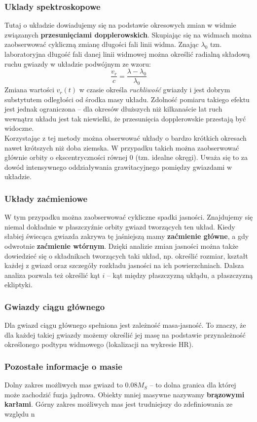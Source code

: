\documentclass[../index.tex]{subfiles}
\begin{document}
            \subsubsection{Uklady spektroskopowe}
                Tutaj o układzie dowiadujemy się na podstawie okresowych zmian w widmie związanych \textbf{przesunięciami dopplerowskich}. Skupiając się na widmach można zaobserwować cykliczną zmianę długości fali linii widma. Znając \(\lambda_0\) tzn. laboratoryjna długość fali danej linii widmowej można określić radialną składową ruchu gwiazdy w układzie podwójnym ze wzoru:
                \begin{equation}
                    \frac{v_r}{c}  = \frac{\lambda -\lambda_0}{\lambda_0} 
                \end{equation} 
                Zmiana wartości \(v_r(t)\) w czasie określa \textit{ruchliwość} gwiazdy i jest dobrym substytutem odległości od środka masy układu. Zdolność pomiaru takiego efektu jest jednak ograniczona \--- dla okresów dłuższych niż kilkanaście lat ruch wewnątrz układu jest tak niewielki, że przesunięcia dopplerowskie przestają być widoczne.\\
                Korzystając z tej metody można obserwować układy o bardzo krótkich okresach nawet krótszych niż doba ziemska. W przypadku takich można zaobserwować głównie orbity o ekscentryczności równej 0 (tzn. idealne okręgi). Uważa się to za dowód intensywnego oddziaływania grawitacyjnego pomiędzy gwiazdami w układzie.
            \subsubsection{Układy zaćmieniowe}
                W tym przypadku można zaobserwować cykliczne spadki jasności. Znajdujemy się niemal dokładnie w płaszczyźnie orbity gwiazd tworzących ten układ. Kiedy słabiej świecąca gwiazda zakrywa tę jaśniejszą mamy \textbf{zaćmienie główne}, a gdy odwrotnie \textbf{zaćmienie wtórnym}. Dzięki analizie zmian jasności można także dowiedzieć się o składnikach tworzących taki układ, np. określić rozmiar, kształt każdej z gwiazd oraz szczegóły rozkładu jasności na ich powierzchniach. Dalsza analiza pozwala też określić kąt \(i\) \--- kąt między płaszczyzną ukłądu, a płaszczyzną ekliptyki.
            \subsubsection{Gwiazdy ciągu głównego}
                Dla gwiazd ciągu głównego spełniona jest zależność masa-jasność. To znaczy, że dla każdej takiej gwiazdy możemy określić jej masę na podstawie przynależność określonego podtypu widmowego (lokalizacji na wykresie HR).
            \subsubsection{Pozostałe informacje o masie}
                Dolny zakres możliwych mas gwiazd to \(0.08 M_S\) \--- to dolna granica dla której może zachodzić fuzja jądrowa. Obiekty mniej masywne nazywamy \textbf{brązowymi karłami}. Górny zakres możliwych mas jest trudniejszy do zdefiniowania ze względu n
\end{document}
